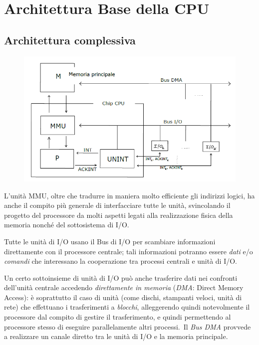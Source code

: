 \chapter{Architettura Base della CPU}

\section{Architettura complessiva}

\begin{figure}[H]
    \centering
    \includegraphics[width=\textwidth]{immagini/ArchitetturaBase.png}
\end{figure}

\noindent L'unità MMU, oltre che tradurre in maniera molto efficiente gli indirizzi logici, ha anche il compito più generale di interfacciare tutte le unità, svincolando il progetto del processore da molti aspetti legati alla realizzazione fisica della memoria nonché del sottosistema di I/O.

Tutte le unità di I/O usano il Bus di I/O per scambiare informazioni direttamente con il processore centrale; tali informazioni potranno essere \textit{dati} e/o \textit{comandi} che interessano la cooperazione tra processi centrali e unità di I/O.

Un certo sottoinsieme di unità di I/O può anche trasferire dati nei confronti dell'unità centrale accedendo \textit{direttamente in memoria} (\textit{DMA}: Direct Memory Access): è soprattutto il caso di unità (come dischi, stampanti veloci, unità di rete) che effettuano i trasferimenti a \textit{blocchi}, alleggerendo quindi notevolmente il processore dal compito di gestire il trasferimento, e quindi permettendo al processore stesso di eseguire parallelamente altri processi.\
Il \textit{Bus DMA} provvede a realizzare un canale diretto tra le unità di I/O e la memoria principale.

